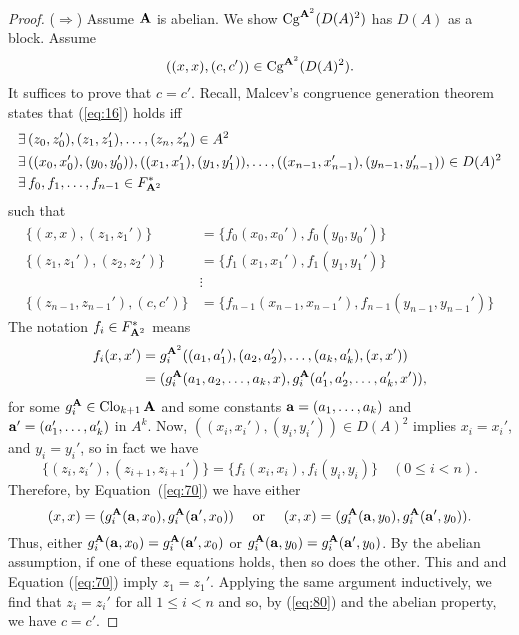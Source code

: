 \begin{proof}
  \noindent ($\Rightarrow$) Assume $\mathbf{A}$ is abelian. We show
  $\operatorname{Cg}^{\mathbf{A}^2}(D(A)^2)$ has $D(A)$ as a block.  Assume
  \begin{equation}
    \label{eq:16}
  ((x,x), (c,c')) \in \operatorname{Cg}^{\mathbf{A}^2}(D(A)^2).
  \end{equation}
  It suffices to prove that $c=c'$.  Recall, Malcev's congruence generation
  theorem states that (\ref{eq:16}) holds iff
  \begin{align*}
  \exists \,& (z_0,z_0'), (z_1,z_1'), \dots, (z_n,z_n') \in A^2\\
    \exists \,& ((x_0,x_0'), (y_0,y_0')), ((x_1,x_1'), (y_1,y_1')), \dots, 
    ((x_{n-1},x_{n-1}'), (y_{n-1},y_{n-1}')) \in D(A)^2\\
    \exists \, & f_0, f_1, \dots, f_{n-1}\in F^*_{\mathbf{A}^2}
  \end{align*}
  such that 
  \begin{align}
    \label{eq:70}
    \{(x, x),(z_1,z_1')\} &= \{f_0(x_0,x_0'), f_0(y_0,y_0')\}\\
\nonumber
     \{(z_1,z_1'),(z_2,z_2')\} &= \{f_1(x_1,x_1'), f_1(y_1,y_1')\}\\
\nonumber
     & \vdots\\
    \label{eq:80}
     \{(z_{n-1},z_{n-1}'),(c, c')\} &= \{f_{n-1}(x_{n-1},x_{n-1}'), f_{n-1}(y_{n-1},y_{n-1}')\}
 \end{align}
The notation $f_i\in F^*_{\mathbf{A}^2}$ means 
\begin{align*}
f_i(x, x') &= g_i^{\mathbf{A}^2}((a_1, a_1'), (a_2, a_2'), \dots, (a_k, a_k'), (x, x'))\\
&= (g_i^{\mathbf{A}}(a_1, a_2, \dots, a_k, x), g_i^{\mathbf{A}}(a_1', a_2', \dots, a_k', x')),
\end{align*}
for some $g_i^{\mathbf{A}} \in \operatorname{Clo}_{k+1}\mathbf{A}$ and some constants 
$\mathbf{a} = (a_1, \dots, a_k)$ and $\mathbf{a}' = (a_1', \dots, a_k')$ in $A^k$. 
Now, $((x_i,x_i'), (y_i,y_i'))\in D(A)^2$ implies 
$x_i=x_i'$, and $y_i=y_i'$, so in fact we have 
\[
     \{(z_i,z_i'),(z_{i+1},z_{i+1}')\} = \{f_i(x_i,x_i), f_i(y_i,y_i)\} \quad (0\leq i < n).
\]
Therefore, by Equation~(\ref{eq:70}) we have either 
\[
     (x,x)= (g_i^{\mathbf{A}}(\mathbf{a}, x_0), g_i^{\mathbf{A}}(\mathbf{a}', x_0)) \quad \text{ or } \quad 
     (x,x)= (g_i^{\mathbf{A}}(\mathbf{a}, y_0), g_i^{\mathbf{A}}(\mathbf{a}', y_0)).
\]
Thus, either $g_i^{\mathbf{A}}(\mathbf{a}, x_0) =  g_i^{\mathbf{A}}(\mathbf{a}', x_0)$ %
or $g_i^{\mathbf{A}}(\mathbf{a}, y_0) =  g_i^{\mathbf{A}}(\mathbf{a}', y_0)$.
By the abelian assumption, if one of these equations holds, then so does the
other. This and and Equation (\ref{eq:70}) imply $z_1 = z_1'$.  Applying the same
argument inductively, we find that $z_i = z_i'$ for all $1\leq i < n$ and so, by
(\ref{eq:80}) and the abelian property, we have $c= c'$.
\end{proof}

